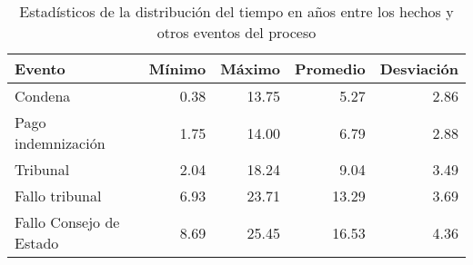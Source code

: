 \begin{table}[h]
\centering
\caption{Estadísticos de la distribución del
tiempo en años entre los hechos y otros eventos del proceso} 
\label{tab:hechos-evento}
\begin{tabular}{lrrrr}
  \hline
Evento & Mínimo & Máximo & Promedio & Desviación \\ 
  \hline
Condena & 0.38 & 13.75 & 5.27 & 2.86 \\ 
  Pago indemnización & 1.75 & 14.00 & 6.79 & 2.88 \\ 
  Tribunal & 2.04 & 18.24 & 9.04 & 3.49 \\ 
  Fallo tribunal & 6.93 & 23.71 & 13.29 & 3.69 \\ 
  Fallo Consejo de Estado & 8.69 & 25.45 & 16.53 & 4.36 \\ 
   \hline
\end{tabular}
\end{table}
